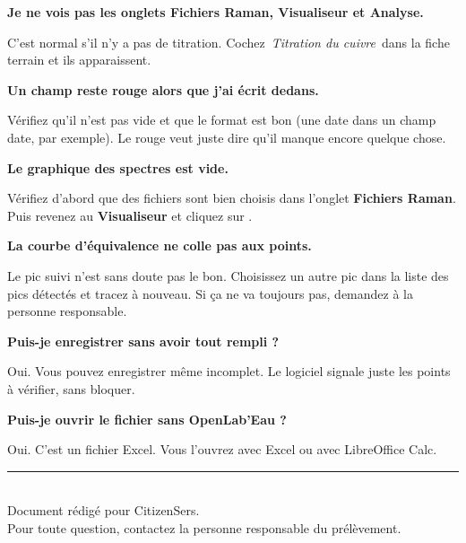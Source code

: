 \documentclass[12pt, a4paper]{article}
\newcommand{\bouton}[1]{%
  \tikz[baseline=(b.base)]{%
    \node[rounded corners=3pt, fill=darkgray!12, draw=darkgray!35,
          inner xsep=5pt, inner ysep=2pt,
          font=\small\bfseries\color{darkgray}] (b) {#1};}%
}
\newcommand{\onglet}[1]{\textbf{\color{mainblue}#1}}
\newcommand{\champ}[1]{\textit{\color{accentteal}\og\,#1\,\fg{}}}
\begin{document}
\textbf{Je ne vois pas les onglets Fichiers Raman, Visualiseur et Analyse.}

C'est normal s'il n'y a pas de titration. Cochez
\champ{Titration du cuivre} dans la fiche terrain et ils apparaissent.

\bigskip

\textbf{Un champ reste rouge alors que j'ai écrit dedans.}

Vérifiez qu'il n'est pas vide et que le format est bon (une date dans un
champ date, par exemple). Le rouge veut juste dire qu'il manque encore
quelque chose.

\bigskip

\textbf{Le graphique des spectres est vide.}

Vérifiez d'abord que des fichiers sont bien choisis dans l'onglet
\onglet{Fichiers Raman}. Puis revenez au \onglet{Visualiseur} et cliquez
sur \bouton{Tracer les spectres}.

\bigskip

\textbf{La courbe d'équivalence ne colle pas aux points.}

Le pic suivi n'est sans doute pas le bon. Choisissez un autre pic dans la
liste des pics détectés et tracez à nouveau. Si ça ne va toujours pas,
demandez à la personne responsable.

\bigskip

\textbf{Puis-je enregistrer sans avoir tout rempli ?}

Oui. Vous pouvez enregistrer même incomplet. Le logiciel signale juste les
points à vérifier, sans bloquer.

\bigskip

\textbf{Puis-je ouvrir le fichier sans OpenLab'Eau ?}

Oui. C'est un fichier Excel. Vous l'ouvrez avec Excel ou avec LibreOffice
Calc.

\vfill
\begin{center}
  \color{rulecolor}\rule{8cm}{0.4pt}\\[6pt]
  \small\color{darkgray}
  Document rédigé pour CitizenSers.\\
  Pour toute question, contactez la personne responsable du prélèvement.
\end{center}
\end{document}
